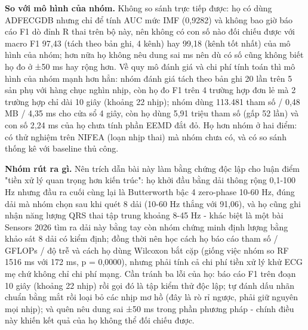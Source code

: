 \documentclass[12pt,a4paper]{article}
\begin{document}
\noindent \textbf{\color{tdtblue}So với mô hình của nhóm.} Không so sánh trực tiếp được: họ có dùng ADFECGDB nhưng chỉ để tính AUC mức IMF (0,9282) và không bao giờ báo cáo F1 dò đỉnh R thai trên bộ này, nên không có con số nào đối chiếu được với macro F1 97,43 (tách theo bản ghi, 4 kênh) hay 99,18 (kênh tốt nhất) của mô hình của nhóm; hơn nữa họ không nêu dung sai ms nên dù có số cũng không biết họ đo ở ±50 ms hay rộng hơn. Về quy mô đánh giá và chi phí tính toán thì mô hình của nhóm mạnh hơn hẳn: nhóm đánh giá tách theo bản ghi 20 lần trên 5 sản phụ với hàng chục nghìn nhịp, còn họ đo F1 trên 4 trường hợp đơn lẻ mà 2 trường hợp chỉ dài 10 giây (khoảng 22 nhịp); nhóm dùng 113.481 tham số / 0,48 MB / 4,35 ms cho cửa sổ 4 giây, còn họ dùng 5,91 triệu tham số (gấp 52 lần) và con số 2,24 ms của họ chưa tính phần EEMD đắt đỏ. Họ hơn nhóm ở hai điểm: có thử nghiệm trên NIFEA (loạn nhịp thai) mà nhóm chưa có, và có so sánh thống kê với baseline thủ công.\par\vspace{3pt}
\noindent \textbf{\color{tdtblue}Nhóm rút ra gì.} Nên trích dẫn bài này làm bằng chứng độc lập cho luận điểm "tiền xử lý quan trọng hơn kiến trúc": họ khởi đầu bằng dải thông rộng 0,1-100 Hz nhưng đầu ra cuối cùng lại là Butterworth bậc 4 zero-phase 10-60 Hz, đúng dải mà nhóm chọn sau khi quét 8 dải (10-60 Hz thắng với 91,06), và họ cũng ghi nhận năng lượng QRS thai tập trung khoảng 8-45 Hz - khác biệt là một bài Sensors 2026 tìm ra dải này bằng tay còn nhóm chứng minh định lượng bằng khảo sát 8 dải có kiểm định; đồng thời nên học cách họ báo cáo tham số / GFLOPs / độ trễ và cách họ dùng Wilcoxon bắt cặp (giống việc nhóm so RF 1516 ms với 172 ms, p = 0,0000), nhưng phải tính cả chi phí tiền xử lý khử ECG mẹ chứ không chỉ chi phí mạng. Cần tránh ba lỗi của họ: báo cáo F1 trên đoạn 10 giây (khoảng 22 nhịp) rồi gọi đó là tập kiểm thử độc lập; tự đánh dấu nhãn chuẩn bằng mắt rồi loại bỏ các nhịp mơ hồ (đây là rò rỉ ngược, phải giữ nguyên mọi nhịp); và quên nêu dung sai ±50 ms trong phần phương pháp - chính điều này khiến kết quả của họ không thể đối chiếu được.\par\vspace{3pt}
\vspace{6pt}
\end{document}
